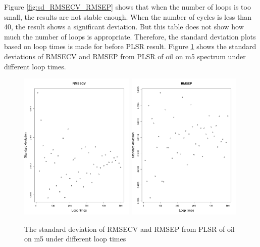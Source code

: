 \documentclass[a4paper,12pt,titlepage]{article} %
\numberwithin{equation}{section}  %
\begin{document}
	
	 Figure \ref{fig:sd_RMSECV_RMSEP} shows that when the number of loops is too small, the results are not stable enough. When the number of cycles is less than 40, the result shows a significant deviation. But this table does not show how much the number of loops is appropriate. Therefore, the standard deviation plots based on loop times is made for before PLSR result. Figure \ref{fig:sd_RMSECV_loop_times_500} shows the standard deviations of RMSECV and RMSEP from PLSR of oil on m5 spectrum under different loop times.
	 
	 
	\begin{figure}[]    %
		\centering           %
		\includegraphics[width=5.5cm, angle=0]{sd_RMSECV_loop_times_500.pdf}  %
		\includegraphics[width=5.5cm, angle=0]{sd_RMSEP_loop_times_500.pdf} %
		\caption{The standard deviation of RMSECV and RMSEP from PLSR of oil on m5 under different loop times}          %
		\label{fig:sd_RMSECV_loop_times_500}               %
	\end{figure}                        %
	
\end{document}
